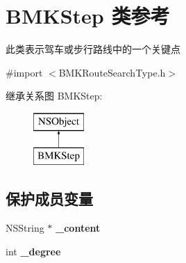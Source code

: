 \hypertarget{interface_b_m_k_step}{\section{B\-M\-K\-Step 类参考}
\label{interface_b_m_k_step}
}


此类表示驾车或步行路线中的一个关键点  




{\ttfamily \#import $<$B\-M\-K\-Route\-Search\-Type.\-h$>$}

继承关系图 B\-M\-K\-Step\-:\begin{figure}[H]
\begin{center}
\leavevmode
\includegraphics[height=2.000000cm]{interface_b_m_k_step}
\end{center}
\end{figure}
\subsection*{保护成员变量}
\begin{DoxyCompactItemize}
\item 
\hypertarget{interface_b_m_k_step_aaec82a08f562e79fd6e71a5c4c8564f4}{N\-S\-String $\ast$ {\bfseries \-\_\-content}}\label{interface_b_m_k_step_aaec82a08f562e79fd6e71a5c4c8564f4}

\item 
\hypertarget{interface_b_m_k_step_ab33cdca63bee56baaf844b19274d80fb}{int {\bfseries \-\_\-degree}}\label{interface_b_m_k_step_ab33cdca63bee56baaf844b19274d80fb}

\end{DoxyCompactItemize}
